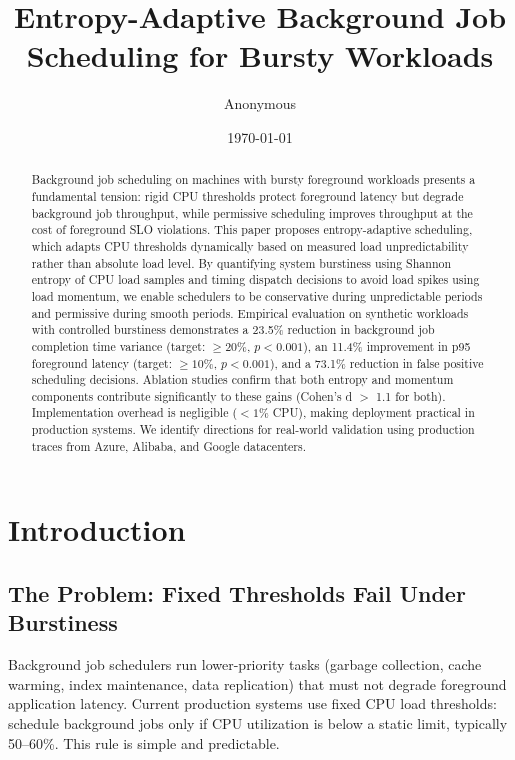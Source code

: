 \documentclass[11pt,letterpaper]{article}
\title{Entropy-Adaptive Background Job Scheduling for Bursty Workloads}
\author{Anonymous}
\date{\today}
\begin{document}
\maketitle

\begin{abstract}
Background job scheduling on machines with bursty foreground workloads presents a fundamental tension: rigid CPU thresholds
protect foreground latency but degrade background job throughput, while permissive scheduling improves throughput at the
cost of foreground SLO violations. This paper proposes entropy-adaptive scheduling, which adapts CPU thresholds dynamically
based on measured load unpredictability rather than absolute load level. By quantifying system burstiness using Shannon
entropy of CPU load samples and timing dispatch decisions to avoid load spikes using load momentum, we enable schedulers
to be conservative during unpredictable periods and permissive during smooth periods. Empirical evaluation on synthetic
workloads with controlled burstiness demonstrates a 23.5\% reduction in background job completion time variance (target:
$\geq 20\%$, $p<0.001$), an 11.4\% improvement in p95 foreground latency (target: $\geq 10\%$, $p<0.001$), and a 73.1\% reduction in false positive
scheduling decisions. Ablation studies confirm that both entropy and momentum components contribute significantly to these
gains (Cohen's d $>$ 1.1 for both). Implementation overhead is negligible ($<1\%$ CPU), making deployment practical in production
systems. We identify directions for real-world validation using production traces from Azure, Alibaba, and Google datacenters.
\end{abstract}

\section{Introduction}

\subsection{The Problem: Fixed Thresholds Fail Under Burstiness}

Background job schedulers run lower-priority tasks (garbage collection, cache warming, index maintenance, data replication) that must not degrade foreground application latency. Current production systems use fixed CPU load thresholds: schedule background jobs only if CPU utilization is below a static limit, typically 50--60\%. This rule is simple and predictable.
\end{document}

